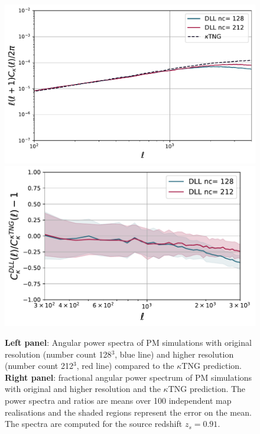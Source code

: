 \documentclass{aa}
\begin{document}
\begin{appendix}
\renewcommand{\thefigure}{C\arabic{figure}}
\setcounter{figure}{0}
\begin{figure}
    \centering
    \includegraphics[width=\columnwidth]{paper/figures/cls_DLL_vs_ktng_high.pdf}
        \includegraphics[width=\columnwidth]{paper/figures/res_cls_DLL_vs_ktng_high.pdf}
    \caption{
    \textbf{Left panel}: Angular power spectra of PM simulations with original resolution (number count 128$^3$, blue line) and higher resolution (number count 212$^3$, red line) compared to the $\kappa$TNG prediction. \textbf{Right panel}: fractional angular power spectrum of PM simulations with original and higher resolution and the $\kappa$TNG prediction. The power spectra and ratios are means over 100 independent map realisations and the shaded regions represent the error on the mean. The spectra are computed for the source redshift $z_s=0.91$. 
}
    \label{fig:ps_comp_high}
\end{figure}


\end{appendix}
\end{document}
